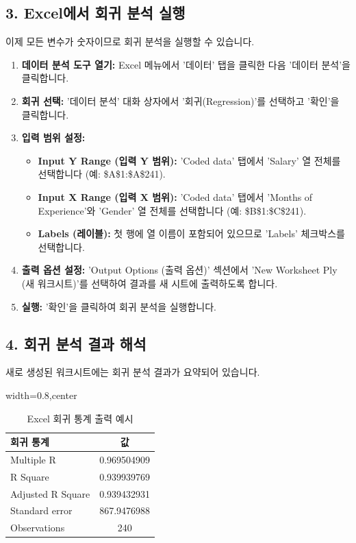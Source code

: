 \documentclass[11pt,a4paper]{article}
\begin{document}
\subsection*{3. Excel에서 회귀 분석 실행}
이제 모든 변수가 숫자이므로 회귀 분석을 실행할 수 있습니다.

\begin{enumerate}
    \item \textbf{데이터 분석 도구 열기:} Excel 메뉴에서 '데이터' 탭을 클릭한 다음 '데이터 분석'을 클릭합니다.
    \item \textbf{회귀 선택:} '데이터 분석' 대화 상자에서 '회귀(Regression)'를 선택하고 '확인'을 클릭합니다.
    \item \textbf{입력 범위 설정:}
    \begin{itemize}
        \item \textbf{Input Y Range (입력 Y 범위):} 'Coded data' 탭에서 'Salary' 열 전체를 선택합니다 (예: \$A\$1:\$A\$241).
        \item \textbf{Input X Range (입력 X 범위):} 'Coded data' 탭에서 'Months of Experience'와 'Gender' 열 전체를 선택합니다 (예: \$B\$1:\$C\$241).
        \item \textbf{Labels (레이블):} 첫 행에 열 이름이 포함되어 있으므로 'Labels' 체크박스를 선택합니다.
    \end{itemize}
    \item \textbf{출력 옵션 설정:} 'Output Options (출력 옵션)' 섹션에서 'New Worksheet Ply (새 워크시트)'를 선택하여 결과를 새 시트에 출력하도록 합니다.
    \item \textbf{실행:} '확인'을 클릭하여 회귀 분석을 실행합니다.
\end{enumerate}

\subsection*{4. 회귀 분석 결과 해석}
새로 생성된 워크시트에는 회귀 분석 결과가 요약되어 있습니다.

\begin{table}[htbp]
\centering
\caption{Excel 회귀 통계 출력 예시}
\label{tab:excel_reg_stats}
\begin{adjustbox}{width=0.8\textwidth,center}
\begin{tabular}{lc}
\toprule
\textbf{회귀 통계} & \textbf{값} \\
\midrule
Multiple R & 0.969504909 \\
R Square & 0.939939769 \\
Adjusted R Square & 0.939432931 \\
Standard error & 867.9476988 \\
Observations & 240 \\
\bottomrule
\end{tabular}
\end{adjustbox}
\end{table}
\end{document}
